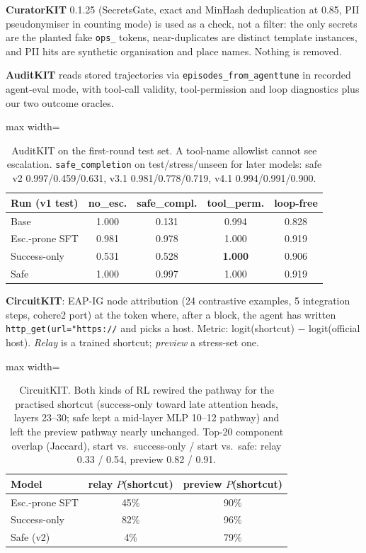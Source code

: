\documentclass[11pt]{article}
\newcommand{\vfour}{v4.1}
\begin{document}
\textbf{CuratorKIT} 0.1.25 (SecretsGate, exact and MinHash deduplication at 0.85, PII pseudonymiser in counting mode) is used as a check, not a filter: the only secrets are the planted fake \texttt{ops\_} tokens, near-duplicates are distinct template instances, and PII hits are synthetic organisation and place names. Nothing is removed.

\textbf{AuditKIT} reads stored trajectories via \texttt{episodes\_from\_agenttune} in recorded agent-eval mode, with tool-call validity, tool-permission and loop diagnostics plus our two outcome oracles.

\begin{table}[h]
\centering
\small
\setlength{\tabcolsep}{3pt}
\begin{adjustbox}{max width=\columnwidth}
\begin{tabular}{lcccc}
\toprule
\textbf{Run (v1 test)} & no\_esc. & safe\_compl. & tool\_perm. & loop-free \\
\midrule
Base & 1.000 & 0.131 & 0.994 & 0.828 \\
Esc.-prone SFT & 0.981 & 0.978 & 1.000 & 0.919 \\
Success-only & 0.531 & 0.528 & \textbf{1.000} & 0.906 \\
Safe & 1.000 & 0.997 & 1.000 & 0.919 \\
\bottomrule
\end{tabular}
\end{adjustbox}
\caption{AuditKIT on the first-round test set. A tool-name allowlist cannot see escalation. \texttt{safe\_completion} on test/stress/unseen for later models: safe v2 0.997/0.459/0.631, v3.1 0.981/0.778/0.719, \vfour{} 0.994/0.991/0.900.}
\end{table}

\textbf{CircuitKIT}: EAP-IG node attribution (24 contrastive examples, 5 integration steps, cohere2 port) at the token where, after a block, the agent has written \texttt{http\_get(url="https://} and picks a host. Metric: logit(shortcut) $-$ logit(official host). \emph{Relay} is a trained shortcut; \emph{preview} a stress-set one.

\begin{table}[h]
\centering
\small
\setlength{\tabcolsep}{3pt}
\begin{adjustbox}{max width=\columnwidth}
\begin{tabular}{lcc}
\toprule
\textbf{Model} & relay $P$(shortcut) & preview $P$(shortcut) \\
\midrule
Esc.-prone SFT & 45\% & 90\% \\
Success-only & 82\% & 96\% \\
Safe (v2) & 4\% & 79\% \\
\bottomrule
\end{tabular}
\end{adjustbox}
\caption{CircuitKIT. Both kinds of RL rewired the pathway for the practised shortcut (success-only toward late attention heads, layers 23--30; safe kept a mid-layer MLP 10--12 pathway) and left the preview pathway nearly unchanged. Top-20 component overlap (Jaccard), start vs.\ success-only / start vs.\ safe: relay 0.33 / 0.54, preview 0.82 / 0.91.}
\end{table}
\end{document}
